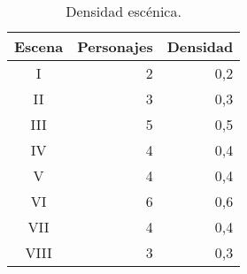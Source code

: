 \begin{table}[!ht]
	\caption{Densidad escénica.}
	\label{tab:densidad}
	\centering\small
	\begin{tabular}{crr}
		\toprule
		\textbf{Escena} & \textbf{Personajes} &\textbf{Densidad}\\
		\midrule
		I&2&0,2\\
		II&3&0,3\\
		III&5&0,5\\
		IV&4&0,4\\
		V&4&0,4\\
		VI&6&0,6\\
		VII&4&0,4\\
		VIII&3&0,3\\		
		\bottomrule
	\end{tabular}
\end{table}
